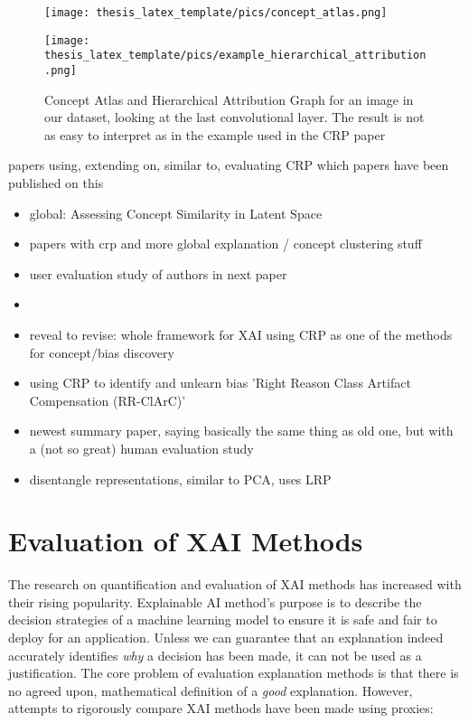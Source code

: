 \begin{figure}[htpb]
    \centering  
  \begin{minipage}[t]{0.45\textwidth}
  \vspace{-\topskip}
	\texttt{[image: thesis\_latex\_template/pics/concept\_atlas.png]}
    \end{minipage}
  \begin{minipage}[t]{0.45\textwidth}
  \vspace{-\topskip}
	\texttt{[image: thesis\_latex\_template/pics/example\_hierarchical\_attribution.png]}
    \end{minipage}
    \label{fig:attr_graph}
    \caption[Concept Atlas and Hierarchical Attribution Graph]{Concept Atlas and Hierarchical Attribution Graph for an image in our dataset, looking at the last convolutional layer. The result is not as easy to interpret as in the example used in the CRP paper}
\end{figure}



papers using, extending on, similar to, evaluating CRP
which papers have been published on this
\begin{itemize}
    \item global: Assessing Concept Similarity in Latent Space
    \item papers with crp and more global explanation / concept clustering stuff 
\cite{Vielhaben2022,Vielhaben2023,Dreyer2023,Dreyer2023a,Fel2023,Fel2023a,Pahde2023}
    \item user evaluation study of authors in next paper \cite{Achtibat2023}
    \item 
      \item reveal to revise: whole framework for XAI using CRP as one of the methods for concept/bias discovery \cite{Pahde2023}
      \item using CRP to identify and unlearn bias 'Right Reason Class Artifact Compensation (RR-ClArC)' \cite{Dreyer2023a}
      \item newest summary paper, saying basically the same thing as old one, but with a (not so great) human evaluation study \cite{Achtibat2023}
      \item disentangle representations, similar to PCA, uses LRP \cite{Chormai2022}
\end{itemize}

\section{Evaluation of XAI Methods}
The research on quantification and evaluation of XAI methods has increased with their rising popularity. 
Explainable AI method's purpose is to describe the decision strategies of a machine learning model to ensure it is safe and fair to deploy for an application. 
Unless we can guarantee that an explanation indeed accurately identifies \textit{why} a decision has been made, it can not be used as a justification.
The core problem of evaluation explanation methods is that there is no agreed upon, mathematical definition of a \textit{good} explanation. However, attempts to rigorously compare XAI methods have been made using proxies:\\

